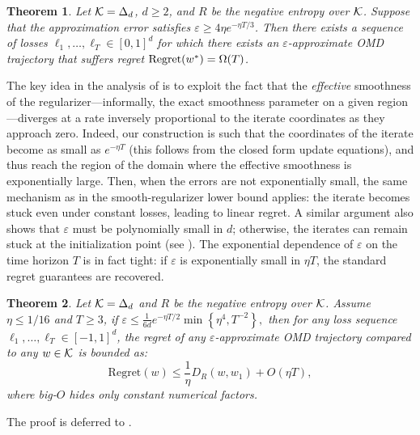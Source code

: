 \documentclass[10pt]{article}
\newtheorem{theorem}{Theorem}
\theoremstyle{definition}
\theoremstyle{remark}
\renewcommand{\epsilon}{\varepsilon}
\newcommand{\curly}[1]{ {\left\{ #1 \right\}}}
\newcommand{\reg}{{\rm Regret}}
\begin{document}
\begin{theorem}
\label{thm:lb_barrier_adversarial}
% 
Let $\mathcal K=\Delta_d$, $d\ge2$, and $R$ be the negative entropy over $\mathcal K$.
Suppose that the approximation error satisfies $\epsilon \ge 4\eta e^{-\eta T/3}$.
Then there exists a sequence of losses $\ell_1, \ldots, \ell_T\in[0,1]^d$ for which there exists an $\epsilon$-approximate OMD trajectory that suffers regret $\reg(w^*) =\Omega(T)$. 
\end{theorem}

%
%
The key idea in the analysis of  is
to exploit the fact that 
the \emph{effective} smoothness of the regularizer---informally, the exact smoothness parameter on a given region---diverges at a rate inversely proportional to the iterate coordinates as they approach zero.
Indeed, our construction is such that the coordinates of the iterate become as small as $e^{-\eta T}$ (this follows from the closed form update equations), and thus reach the region of the domain where the effective smoothness is exponentially large.
Then, 
when the errors are not exponentially small, the same mechanism as in the smooth-regularizer lower bound applies: the iterate becomes stuck even under constant losses, leading to linear regret. A similar argument also shows that $\epsilon$ must be polynomially small in $d$; otherwise, the iterates can remain stuck at the initialization point (see ). The exponential dependence of $\epsilon$ on the time horizon $T$ is in fact tight: if $\epsilon$ is exponentially small in $\eta T$, the standard regret guarantees are recovered.

\begin{theorem}
\label{thm:up_barrier_adversarial}
% 
Let $\mathcal K=\Delta_d$ and $R$ be the negative entropy over $\mathcal K$.
Assume $\eta \le 1/16$ and $T\ge 3$, if 
$\epsilon \leq \tfrac{1}{6d} e^{-\eta T/2} \min\curly{\eta^4,T^{-2}},$
then for any loss sequence $\ell_1, \dots, \ell_T \in [-1,1]^d$, the regret of any \(\epsilon\)-approximate OMD 
trajectory compared to any $w \in \mathcal K$ is bounded as:
\[
\mathrm{Regret}(w) \le \frac{1}{\eta} D_R(w, w_1) + O(\eta T),
\]
where big-$O$ hides only constant numerical factors. 
\end{theorem}
The proof is deferred to . 
\end{document}
